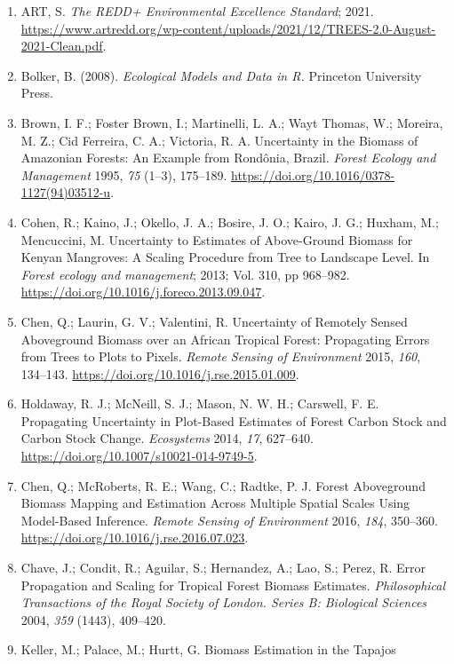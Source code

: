 \documentclass[
]{article}
\begin{document}
\begin{enumerate}
\def\labelenumi{(\arabic{enumi})}
\item
  ART, S. \emph{The REDD+ Environmental Excellence Standard}; 2021.
  \url{https://www.artredd.org/wp-content/uploads/2021/12/TREES-2.0-August-2021-Clean.pdf}.
\item
  Bolker, B. (2008). \emph{Ecological Models and Data in R.} Princeton
  University Press.
\item
  Brown, I. F.; Foster Brown, I.; Martinelli, L. A.; Wayt Thomas, W.;
  Moreira, M. Z.; Cid Ferreira, C. A.; Victoria, R. A. Uncertainty in
  the Biomass of Amazonian Forests: An Example from Rondônia, Brazil.
  \emph{Forest Ecology and Management} 1995, \emph{75} (1--3), 175--189.
  \url{https://doi.org/10.1016/0378-1127(94)03512-u}.
\item
  Cohen, R.; Kaino, J.; Okello, J. A.; Bosire, J. O.; Kairo, J. G.;
  Huxham, M.; Mencuccini, M. Uncertainty to Estimates of Above-Ground
  Biomass for Kenyan Mangroves: A Scaling Procedure from Tree to
  Landscape Level. In \emph{Forest ecology and management}; 2013; Vol.
  310, pp 968--982. \url{https://doi.org/10.1016/j.foreco.2013.09.047}.
\item
  Chen, Q.; Laurin, G. V.; Valentini, R. Uncertainty of Remotely Sensed
  Aboveground Biomass over an African Tropical Forest: Propagating
  Errors from Trees to Plots to Pixels. \emph{Remote Sensing of
  Environment} 2015, \emph{160}, 134--143.
  \hyperref[0]{https://doi.org/10.1016/j.rse.2015.01.009}.
\item
  Holdaway, R. J.; McNeill, S. J.; Mason, N. W. H.; Carswell, F. E.
  Propagating Uncertainty in Plot-Based Estimates of Forest Carbon Stock
  and Carbon Stock Change. \emph{Ecosystems} 2014, \emph{17}, 627--640.
  \hyperref[0]{https://doi.org/10.1007/s10021-014-9749-5}.
\item
  Chen, Q.; McRoberts, R. E.; Wang, C.; Radtke, P. J. Forest Aboveground
  Biomass Mapping and Estimation Across Multiple Spatial Scales Using
  Model-Based Inference. \emph{Remote Sensing of Environment} 2016,
  \emph{184}, 350--360. \url{https://doi.org/10.1016/j.rse.2016.07.023}.
\item
  Chave, J.; Condit, R.; Aguilar, S.; Hernandez, A.; Lao, S.; Perez, R.
  Error Propagation and Scaling for Tropical Forest Biomass Estimates.
  \emph{Philosophical Transactions of the Royal Society of London.
  Series B: Biological Sciences} 2004, \emph{359} (1443), 409--420.
\item
  Keller, M.; Palace, M.; Hurtt, G. Biomass Estimation in the Tapajos

\end{enumerate}
\end{document}
